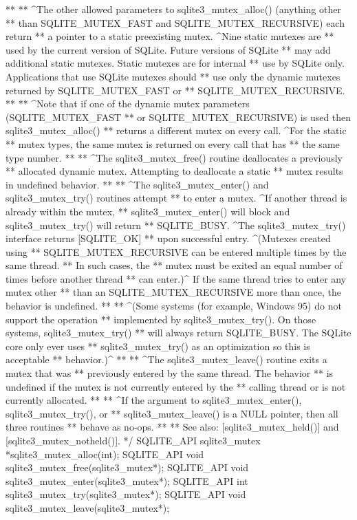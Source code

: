 \begin{Codex}[label=sqlite3.h,numbers=left]
{**
** ^The other allowed parameters to sqlite3_mutex_alloc() (anything other
** than SQLITE_MUTEX_FAST and SQLITE_MUTEX_RECURSIVE) each return
** a pointer to a static preexisting mutex.  ^Nine static mutexes are
** used by the current version of SQLite.  Future versions of SQLite
** may add additional static mutexes.  Static mutexes are for internal
** use by SQLite only.  Applications that use SQLite mutexes should
** use only the dynamic mutexes returned by SQLITE_MUTEX_FAST or
** SQLITE_MUTEX_RECURSIVE.
**
** ^Note that if one of the dynamic mutex parameters (SQLITE_MUTEX_FAST
** or SQLITE_MUTEX_RECURSIVE) is used then sqlite3_mutex_alloc()
** returns a different mutex on every call.  ^For the static
** mutex types, the same mutex is returned on every call that has
** the same type number.
**
** ^The sqlite3_mutex_free() routine deallocates a previously
** allocated dynamic mutex.  Attempting to deallocate a static
** mutex results in undefined behavior.
**
** ^The sqlite3_mutex_enter() and sqlite3_mutex_try() routines attempt
** to enter a mutex.  ^If another thread is already within the mutex,
** sqlite3_mutex_enter() will block and sqlite3_mutex_try() will return
** SQLITE_BUSY.  ^The sqlite3_mutex_try() interface returns [SQLITE_OK]
** upon successful entry.  ^(Mutexes created using
** SQLITE_MUTEX_RECURSIVE can be entered multiple times by the same thread.
** In such cases, the
** mutex must be exited an equal number of times before another thread
** can enter.)^  If the same thread tries to enter any mutex other
** than an SQLITE_MUTEX_RECURSIVE more than once, the behavior is undefined.
**
** ^(Some systems (for example, Windows 95) do not support the operation
** implemented by sqlite3_mutex_try().  On those systems, sqlite3_mutex_try()
** will always return SQLITE_BUSY. The SQLite core only ever uses
** sqlite3_mutex_try() as an optimization so this is acceptable 
** behavior.)^
**
** ^The sqlite3_mutex_leave() routine exits a mutex that was
** previously entered by the same thread.   The behavior
** is undefined if the mutex is not currently entered by the
** calling thread or is not currently allocated.
**
** ^If the argument to sqlite3_mutex_enter(), sqlite3_mutex_try(), or
** sqlite3_mutex_leave() is a NULL pointer, then all three routines
** behave as no-ops.
**
** See also: [sqlite3_mutex_held()] and [sqlite3_mutex_notheld()].
*/
SQLITE_API sqlite3_mutex *sqlite3_mutex_alloc(int);
SQLITE_API void sqlite3_mutex_free(sqlite3_mutex*);
SQLITE_API void sqlite3_mutex_enter(sqlite3_mutex*);
SQLITE_API int sqlite3_mutex_try(sqlite3_mutex*);
SQLITE_API void sqlite3_mutex_leave(sqlite3_mutex*);

}
\end{Codex}
